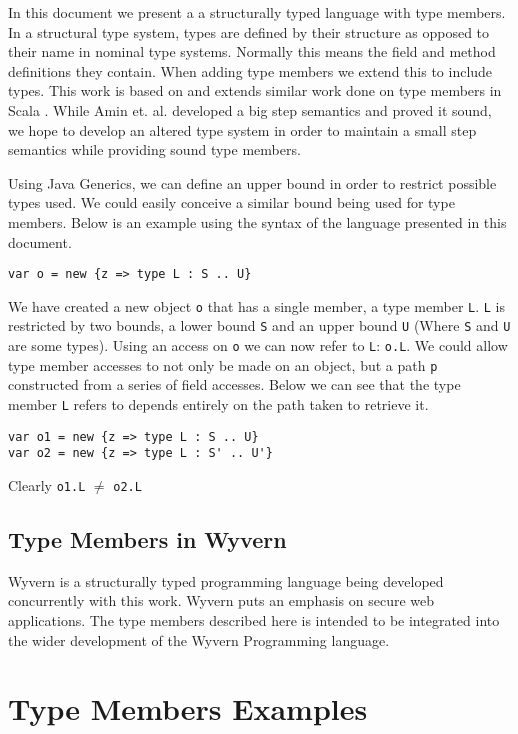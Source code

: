 \documentclass{llncs}
\numberwithin{subcase}{casethm}
\numberwithin{casethm}{theorem}
\numberwithin{casethm}{lemma}
\begin{document}
In this document we present a a structurally typed language with type 
members. In a structural type system, types are defined by their structure 
as opposed to their name in nominal type systems. Normally this means the 
field and method definitions they contain. When adding type members 
we extend this to include types. This work is based on and extends 
similar work done on type members in Scala \cite{Amin:2012}.
While Amin et. al.\cite{Amin:2014} developed a big step semantics and 
proved it sound, we hope to develop an altered type system in order to maintain 
a small step semantics while providing sound type members. 

Using Java Generics, we can define an upper bound in order to restrict 
possible types used. We could easily conceive a similar bound being 
used for type members. Below is an example using the syntax of the language 
presented in this document.
\begin{lstlisting}[mathescape, style=custom_lang]
var o = new {z => type L : S .. U}
\end{lstlisting}
We have created a new object \texttt{o} that has a single member, a type member 
\texttt{L}. \texttt{L} is restricted by two bounds, a lower bound \texttt{S} 
and an upper bound \texttt{U} (Where \texttt{S} and \texttt{U} are some types). 
Using an access on \texttt{o} we can now refer to 
\texttt{L}: \texttt{o.L}.
We could allow type member accesses to not only be made on  
an object, but a path \texttt{p} constructed from a series of field accesses.
Below we can see that the type member \texttt{L} refers to 
depends entirely on the path taken to retrieve it.
\begin{lstlisting}[mathescape, style=custom_lang]
var o1 = new {z => type L : S .. U}
var o2 = new {z => type L : S' .. U'}
\end{lstlisting}
Clearly \texttt{o1.L} $\neq$ \texttt{o2.L}


\subsection{Type Members in Wyvern}
Wyvern is a structurally typed programming language being 
developed concurrently with this work. Wyvern puts an emphasis 
on secure web applications. The type members described here 
is intended to be integrated into the wider development of the 
Wyvern Programming language.




\section{Type Members Examples}
\end{document}
